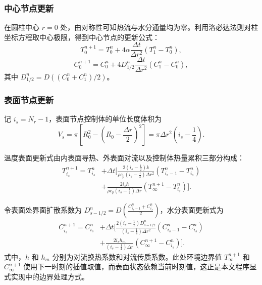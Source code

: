 \documentclass[withoutpreface,bwprint]{cumcm_thesis}
\begin{document}
\subsubsection{中心节点更新}

在圆柱中心 \(r=0\) 处，由对称性可知热流与水分通量均为零。利用洛必达法则对柱坐标方程取中心极限，得到中心节点的更新公式：
\begin{equation}
T_0^{n+1} = T_0^n + 4\alpha \frac{\Delta t}{\Delta r^2} (T_1^n - T_0^n),
\end{equation}
\begin{equation}
C_0^{n+1} = C_0^n + 4D_{1/2}^n \frac{\Delta t}{\Delta r^2} (C_1^n - C_0^n),
\end{equation}
其中 \(D_{1/2}^n = D\left((C_0^n + C_1^n)/2\right)\)。

\subsubsection{表面节点更新}

记 \(i_s = N_r-1\)，表面节点控制体的单位长度体积为
\begin{equation}
V_s = \pi \left[ R_0^2 - \left( R_0 - \frac{\Delta r}{2} \right)^2 \right] = \pi \Delta r^2 \left( i_s - \frac{1}{4} \right).
\end{equation}

温度表面更新式由内表面导热、外表面对流以及控制体热量累积三部分构成：
\begin{equation}
\begin{aligned}
T_{i_s}^{n+1} = T_{i_s}^n &+ \Delta t \Bigg[ \frac{2(i_s - \frac{1}{2})k}{\rho c_p (i_s - \frac{1}{4})\Delta r^2} (T_{i_s-1}^n - T_{i_s}^n) \\
&+ \frac{2 i_s h}{\rho c_p (i_s - \frac{1}{4})\Delta r} (T_\infty^{n+1} - T_{i_s}^n) \Bigg].
\end{aligned}
\end{equation}

令表面处界面扩散系数为 \(D_{s-1/2}^n = D\left( \frac{C_{i_s-1}^n + C_{i_s}^n}{2} \right)\)，水分表面更新式为
\begin{equation}
\begin{aligned}
C_{i_s}^{n+1} = C_{i_s}^n &+ \Delta t \Bigg[ \frac{2(i_s - \frac{1}{2}) D_{s-1/2}^n}{(i_s - \frac{1}{4})\Delta r^2} (C_{i_s-1}^n - C_{i_s}^n) \\
&+ \frac{2 i_s h_m}{(i_s - \frac{1}{4})\Delta r} (C_\infty^{n+1} - C_{i_s}^n) \Bigg].
\end{aligned}
\end{equation}
式中，\(h\) 和 \(h_m\) 分别为对流换热系数和对流传质系数。此处环境边界值 \(T_\infty^{n+1}\) 和 \(C_\infty^{n+1}\) 使用下一时刻的插值取值，而表面状态依赖当前时刻值，这正是本文程序显式实现中的边界处理方式。
\end{document}
